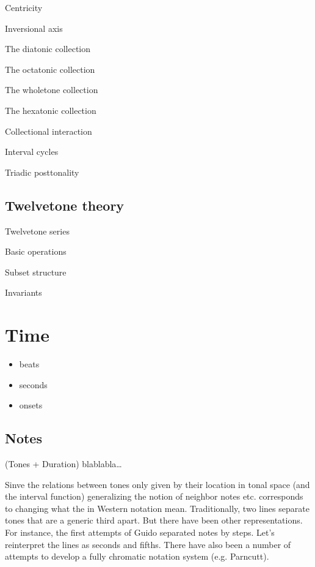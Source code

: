 \documentclass[letterpaper,10pt,english]{sphinxmanual}
\begin{document}
\sphinxAtStartPar
Centricity

\sphinxAtStartPar
Inversional axis

\sphinxAtStartPar
The diatonic collection

\sphinxAtStartPar
The octatonic collection

\sphinxAtStartPar
The whole\sphinxhyphen{}tone collection

\sphinxAtStartPar
The hexatonic collection

\sphinxAtStartPar
Collectional interaction

\sphinxAtStartPar
Interval cycles

\sphinxAtStartPar
Triadic post\sphinxhyphen{}tonality


\section{Twelve\sphinxhyphen{}tone theory}
\label{\detokenize{3_set_theory:twelve-tone-theory}}
\sphinxAtStartPar
Twelve\sphinxhyphen{}tone series

\sphinxAtStartPar
Basic operations

\sphinxAtStartPar
Subset structure

\sphinxAtStartPar
Invariants


\chapter{Time}
\label{\detokenize{4_time:time}}\label{\detokenize{4_time:id1}}\label{\detokenize{4_time::doc}}\begin{itemize}
\item {} 
\sphinxAtStartPar
beats

\item {} 
\sphinxAtStartPar
seconds

\item {} 
\sphinxAtStartPar
onsets

\end{itemize}


\section{Notes}
\label{\detokenize{4_time:notes}}
\sphinxAtStartPar
(Tones + Duration)
blablabla…

\sphinxAtStartPar
Sinve the relations between tones only given by
their location in tonal space (and the interval function)
generalizing the notion of neighbor notes etc. corresponds
to changing what the  in Western notation mean.
Traditionally, two lines separate tones that are a generic third apart.
But there have been other representations.
For instance, the first attempts of Guido separated notes by steps.
Let’s reinterpret the lines as seconds and fifths.
There have also been a number of attempts to develop a fully chromatic
notation system (e.g. Parncutt).
\end{document}

